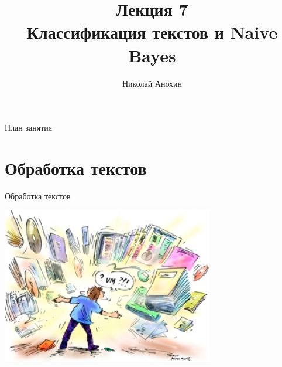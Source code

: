 \documentclass[aspectratio=169]{beamer}
\author{Николай Анохин}
\title{\newline \newline \newline Лекция 7 \\ Классификация текстов и Naive Bayes}
\let\otp\titlepage
\renewcommand{\titlepage}{\otp\addtocounter{framenumber}{-1}}
\begin{document}
\begin{frame}[plain]
\titlepage
\end{frame}

\begin{frame}{План занятия}
\tableofcontents
\end{frame}


\section{Обработка текстов}


\begin{frame}{}

\begin{center}
\Large Обработка текстов

\vspace{1em}
\includegraphics[height=0.5\textheight]{images/text.png}
\end{center}

\end{frame}
\end{document}
